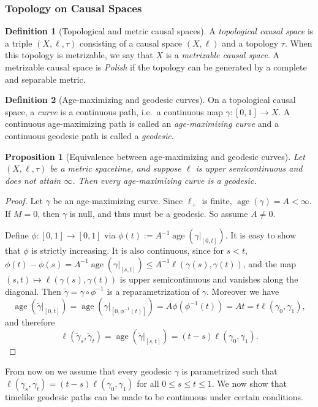 \documentclass{article}
\DeclareMathOperator{\age}{age}
\newtheorem{prop}[theorem]{Proposition}
\theoremstyle{definition}
\newtheorem{defn}{Definition}[section]
\begin{document}
\subsubsection{Topology on Causal Spaces} 

\begin{defn}[Topological and metric causal spaces] A {\it topological causal space} is a triple $(X,\ell,\tau)$ consisting of a causal space $(X,\ell)$ and a topology $\tau$. When this topology is metrizable, we say that $X$ is a {\it metrizable causal space}. A metrizable causal space is {\it Polish} if the topology can be generated by a complete and separable metric. 
\end{defn}


\begin{defn}[Age-maximizing and geodesic curves]
On a topological causal space,  a {\it curve} is a continuous path, i.e.\ a continuous map $\gamma:[0,1]\to X$. A continuous age-maximizing path is called an {\it age-maximizing curve} and a continuous geodesic path is called a {\it geodesic}. 
 \end{defn}
 \begin{prop}[Equivalence between age-maximizing and geodesic curves]\label{agemaxtogeodesic}
Let $(X,\ell ,\tau)$ be a metric spacetime, and suppose $\ell$ is upper semicontinuous and does not attain $\infty$. Then every age-maximizing curve is a geodesic. 
 \end{prop}
\begin{proof}
Let $\gamma$ be an age-maximizing curve. Since $\ell_+$ is finite, $\age(\gamma)=A<\infty$. If $M=0$, then $\gamma$ is null, and thus must be a geodesic. So assume $A\neq 0$. 

Define $\phi:[0,1]\to [0,1]$ via $\phi(t):= A^{-1}\age(\gamma\vert_{[0,t]})$. It is easy to show that $\phi$ is strictly increasing. It is also continuous, since for $s<t$,  $\phi(t)-\phi(s)=A^{-1}\age(\gamma\vert_{[s,t]})\leq A^{-1}\ell(\gamma(s),\gamma(t))$, and the map $(s,t)\mapsto \ell(\gamma(s),\gamma(t))$ is upper semicontinuous and vanishes along the diagonal. Then  $\tilde \gamma = \gamma\circ \phi^{-1}$ is a reparametrization of $\gamma$. Moreover we have 
\[\age(\tilde \gamma\vert_{[0, t]})=\age(\gamma\vert_{[0,\phi^{-1}(t)]})= A\phi(\phi^{-1}(t))=At=t\ell(\gamma_0, \gamma_1),\]
and therefore 
\[\ell(\tilde\gamma_s,\tilde \gamma_t)=\age(\tilde \gamma\vert_{[s,t]})= (t-s)\ell(\gamma_0,\gamma_1).\]
\end{proof}
From now on we assume that every geodesic $\gamma$ is parametrized such that $\ell(\gamma_s,\gamma_t)=(t-s)\ell(\gamma_0,\gamma_1)$ for all $0\leq s\leq t\leq 1$. We now show that timelike geodesic paths can be made to be continuous under certain conditions.
\end{document}
